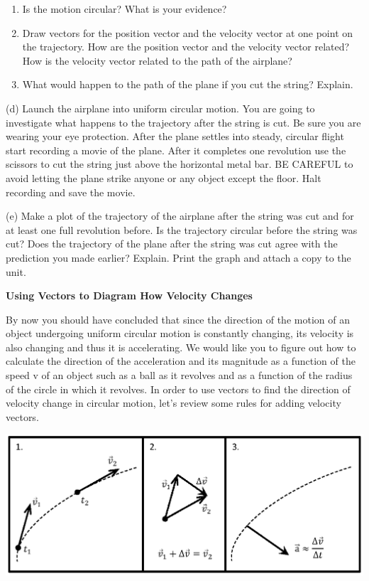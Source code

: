 \begin{enumerate}
\item Is the motion circular? What is your evidence?
\answerspace{10mm}

\item Draw vectors for the position vector and the velocity vector at one point on
the trajectory. How are the position vector and the velocity vector related? How is the velocity vector
related to the path of the airplane?
\answerspace{30mm}

\item What would happen to the path of the plane if you cut the string? Explain.
\answerspace{20mm}

\end{enumerate}

\pagebreak
(d) Launch the airplane into uniform circular motion. You are going to investigate
what happens to the trajectory after the string is cut. Be sure you are wearing
your eye protection. After the plane settles into steady, circular flight start
recording a movie of the plane. After it completes one revolution use the scissors
to cut the string just above the horizontal metal bar. BE CAREFUL to avoid letting
the plane strike anyone or any object except the floor. Halt recording and save
the movie.

(e) Make a plot of the trajectory of the airplane after the string was cut and
for at least one full revolution before. Is the trajectory circular before the
string was cut? Does the trajectory of the plane after the string was cut agree
with the prediction you made earlier? Explain. Print the graph and attach a
copy to the unit.
\vspace{20mm}

\textbf{Using Vectors to Diagram How Velocity Changes} 

By now you should have concluded that since the direction of the motion of an
object undergoing uniform circular motion is constantly changing, its velocity
is also changing and thus it is accelerating. We would like you to figure out
how to calculate the direction of the acceleration and its magnitude as a function
of the speed v of an object such as a ball as it revolves and as a function
of the radius of the circle in which it revolves. In order to use vectors to
find the direction of velocity change in circular motion, let's review some
rules for adding velocity vectors.

\vspace{0.3cm}
{\par\centering \includegraphics{circ_motion/circ_motion_fig1_new.eps} \par}
\vspace{0.3cm}

